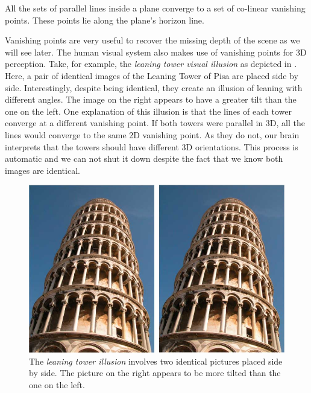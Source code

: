 All the sets of parallel lines inside a plane converge to a set of co-linear vanishing points. These points lie along the plane's horizon line.

Vanishing points are very useful to recover the missing depth of the scene as we will see later. The human visual system also makes use of vanishing points for 3D perception. Take, for example, the {\em leaning tower visual illusion} \cite{Kingdom2017} as depicted in \fig{\ref{fig:LeaningTower1}}. Here, a pair of identical images of the Leaning Tower of Pisa are placed side by side. Interestingly, despite being identical, they create an illusion of leaning with different angles. The image on the right appears to have a greater tilt than the one on the left. One explanation of this illusion is that the lines of each tower converge at a different vanishing point. If both towers were parallel in 3D, all the lines would converge to the same 2D vanishing point. As they do not, our brain interprets that the towers should have different 3D orientations. This process is automatic and we can not shut it down despite the fact that we know both images are identical.


\begin{figure}[t]
\centerline{
\includegraphics[width=1\linewidth]{figures/single_view_3d/LeaningTower1.jpg}
}
\caption{The {\em leaning tower illusion} \cite{Kingdom2017} involves two identical pictures placed side by side. The picture on the right appears to be more tilted than the one on the left.}
\label{fig:LeaningTower1}
\end{figure}


